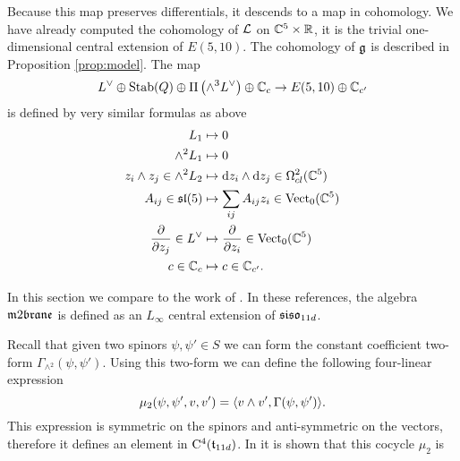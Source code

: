 \documentclass[11pt]{amsart}
\begin{document}
Because this map preserves differentials, it descends to a map in cohomology. 
We have already computed the cohomology of $\mathcal L$ on $\mathbb C^5 \times \mathbb R$, it is the trivial one-dimensional central extension of $E (5,10)$. 
The cohomology of $\mathfrak g$ is described in Proposition \ref{prop:model}. 
The map
\[
L^\vee \oplus {\rm Stab}(Q) \oplus \Pi \left(\wedge^3 L^\vee\right) \oplus \mathbb C_c \to E (5,10) \oplus \mathbb C_{c'}
\]
is defined by very similar formulas as above
\begin{align*}
 L_1 & \mapsto 0 \\
 \wedge^2 L_1 & \mapsto 0 \\
z_i \wedge z_j \in \wedge^2 L_2 & \mapsto {\rm d} z_i \wedge {\rm d} z_j \in \Omega^{2}_{cl} (\mathbb C^5) \\
A_{ij} \in \mathfrak{sl}(5) & \mapsto \sum_{ij} A_{ij} z_i \in {\rm Vect}_0(\mathbb C^5) \\ \frac{\partial}{\partial z_j} \in L^\vee & \mapsto
\frac{\partial}{\partial z_i} \in {\rm Vect}_0(\mathbb C^5) \\
c \in \mathbb C_c & \mapsto c \in \mathbb C_{c'} .
\end{align*}

\parsec[]

In this section we compare to the work of .
In these references, the algebra $\m2$ is defined as an $L_\infty$  
central extension of $\mathfrak{siso}_{11d}$. 

Recall that given two spinors $\psi, \psi' \in S$ we can form the constant coefficient two-form $\Gamma_{\wedge^2} (\psi, \psi')$. 
Using this two-form we can define the following four-linear expression
\[
\mu_2 (\psi, \psi',v,v') = \langle v \wedge v', \Gamma(\psi, \psi')\rangle .
\]
This expression is symmetric on the spinors and anti-symmetric on the vectors, therefore it defines an element in ${\rm C}^4(\mathfrak t_{11d})$. 
In \cite{??} it is shown that this cocycle $\mu_2$ is 

\end{document}
